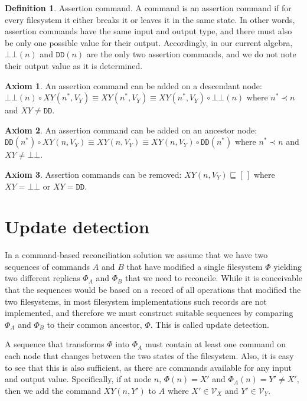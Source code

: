 \documentclass[12pt]{article}
\newcommand{\setvx}[1]{\mathcal{V}_{#1}}
\newcommand{\empt}{\bot}
\newcommand{\FS}{\Phi} %
\newcommand{\nn}{n^*} %
\newcommand{\fscommand}[2]{{#1#2}}
\newcommand{\fsregcommandchar}[1]{\mathtt{#1}}
\newcommand{\fsregcommand}[2]{\fscommand{\fsregcommandchar{#1}}{\fsregcommandchar{#2}}}
\newcommand{\cbb}{\fsregcommand{\empt}{\empt}}
\newcommand{\cdd}{\fsregcommand{D}{D}}
\newcommand{\cxy}{\fscommand{X}{Y}}
\newcommand{\cc}{\circ} %
\newcommand{\descendant}{\prec}
\newcommand{\eqext}{\sqsubseteq}
\newcommand{\emptyseq}{[\,]} %
\theoremstyle{definition}
\newtheorem{mydef}{Definition}
\newtheorem{myax}{Axiom}
\begin{document}
\begin{mydef}{Assertion command.}
A command is an assertion command if
for every filesystem it either breaks it or leaves it in the same state.
In other words, assertion commands have the same input and output type,
and there must also be only one possible value for their output.
Accordingly, in our current algebra, $\cbb(n)$ and $\cdd(n)$ are the only two assertion commands,
and we do not note their output value as it is determined.
\end{mydef}

\begin{myax}\label{ax_child_assert}
An assertion command can be added on a descendant node:
$\cbb(n)\cc \cxy(\nn,V_Y) \equiv \cxy(\nn,V_Y) \equiv \cxy(\nn,V_Y)\cc \cbb(n)$ where $\nn\descendant n$ and $\cxy\neq\cdd$.
\end{myax}

\begin{myax}\label{ax_parent_assert}
An assertion command can be added on an ancestor node:
$\cdd(\nn)\cc \cxy(n,V_Y) \equiv \cxy(n,V_Y) \equiv \cxy(n,V_Y)\cc \cdd(\nn)$ where $\nn\descendant n$ and $\cxy\neq\cbb$.
\end{myax}

\begin{myax}\label{ax_assert}
Assertion commands can be removed:
$\cxy(n,V_Y) \eqext \emptyseq$ where $\cxy=\cbb$ or $\cxy=\cdd$.
\end{myax}



\section{Update detection}

In a command-based reconciliation solution we assume that we have two sequences of commands
$A$ and $B$ that have modified a single filesystem $\FS$ yielding two different replicas $\FS_A$ and $\FS_B$ that we
need to reconcile. While it is conceivable that the sequences would be based on a record of
all operations that modified the two filesystems, in most filesystem implementations
such records are not implemented, and therefore we must construct suitable sequences
by comparing $\FS_A$ and $\FS_B$ to their common ancestor, $\FS$. This is called update detection.

A sequence that transforms $\FS$ into $\FS_A$ must contain at least one command on each node
that changes between the two states of the filesystem. Also, it is easy to see that this is also
sufficient, as there are commands available for any input and output value. 
Specifically, if at node $n$, $\FS(n)=X'$ and $\FS_A(n)=Y'\neq X'$, then we add the command $\cxy(n,Y')$ to $A$
where $X'\in\setvx{X}$ and $Y'\in\setvx{Y}$.
\end{document}
